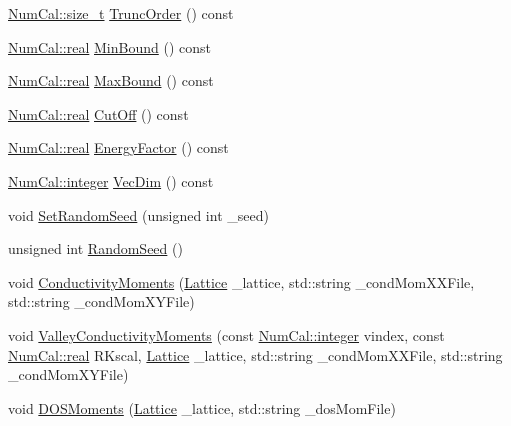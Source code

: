 \begin{DoxyCompactItemize}
\item 
\hyperlink{namespaceNumCal_aa3e2bbd7c48c91db220faeb896cd15a4}{Num\+Cal\+::size\+\_\+t} \hyperlink{classNumCal_1_1Kpm_af8959c2052a3060ccba9196038dc9408}{Trunc\+Order} () const 
\item 
\hyperlink{namespaceNumCal_ac10564761316cff6fb75fe8bfccd6def}{Num\+Cal\+::real} \hyperlink{classNumCal_1_1Kpm_af5d91eca3075d8991325e0a761e3c71e}{Min\+Bound} () const 
\item 
\hyperlink{namespaceNumCal_ac10564761316cff6fb75fe8bfccd6def}{Num\+Cal\+::real} \hyperlink{classNumCal_1_1Kpm_a97c32cbaa01288e38c78d1df67ad2f33}{Max\+Bound} () const 
\item 
\hyperlink{namespaceNumCal_ac10564761316cff6fb75fe8bfccd6def}{Num\+Cal\+::real} \hyperlink{classNumCal_1_1Kpm_ae80238c3253e5f8be4365cb460a1b3e9}{Cut\+Off} () const 
\item 
\hyperlink{namespaceNumCal_ac10564761316cff6fb75fe8bfccd6def}{Num\+Cal\+::real} \hyperlink{classNumCal_1_1Kpm_a0b8280f98a1fa863991a7aa2c48fd79c}{Energy\+Factor} () const 
\item 
\hyperlink{namespaceNumCal_ae1031b42812e871d8f5bd9b7b15fc7d8}{Num\+Cal\+::integer} \hyperlink{classNumCal_1_1Kpm_ad13e93e7a6c5bf93fca2b779a85b1317}{Vec\+Dim} () const 
\item 
void \hyperlink{classNumCal_1_1Kpm_ad61220cb1d97c7aad33bbbecc6c28d96}{Set\+Random\+Seed} (unsigned int \+\_\+seed)
\item 
unsigned int \hyperlink{classNumCal_1_1Kpm_a0d1f3e0d12ed40e124d75ee1fb595e1a}{Random\+Seed} ()
\item 
void \hyperlink{classNumCal_1_1Kpm_a9159dc54cfc4381f499b436fbc789423}{Conductivity\+Moments} (\hyperlink{classNumCal_1_1Lattice}{Lattice} \+\_\+lattice, std\+::string \+\_\+cond\+Mom\+X\+X\+File, std\+::string \+\_\+cond\+Mom\+X\+Y\+File)
\item 
void \hyperlink{classNumCal_1_1Kpm_a794390bb25114083062775f31a2f3f56}{Valley\+Conductivity\+Moments} (const \hyperlink{namespaceNumCal_ae1031b42812e871d8f5bd9b7b15fc7d8}{Num\+Cal\+::integer} vindex, const \hyperlink{namespaceNumCal_ac10564761316cff6fb75fe8bfccd6def}{Num\+Cal\+::real} R\+Kscal, \hyperlink{classNumCal_1_1Lattice}{Lattice} \+\_\+lattice, std\+::string \+\_\+cond\+Mom\+X\+X\+File, std\+::string \+\_\+cond\+Mom\+X\+Y\+File)
\item 
void \hyperlink{classNumCal_1_1Kpm_aec192ebcd8126f53927d53265e47095e}{D\+O\+S\+Moments} (\hyperlink{classNumCal_1_1Lattice}{Lattice} \+\_\+lattice, std\+::string \+\_\+dos\+Mom\+File)
\end{DoxyCompactItemize}
